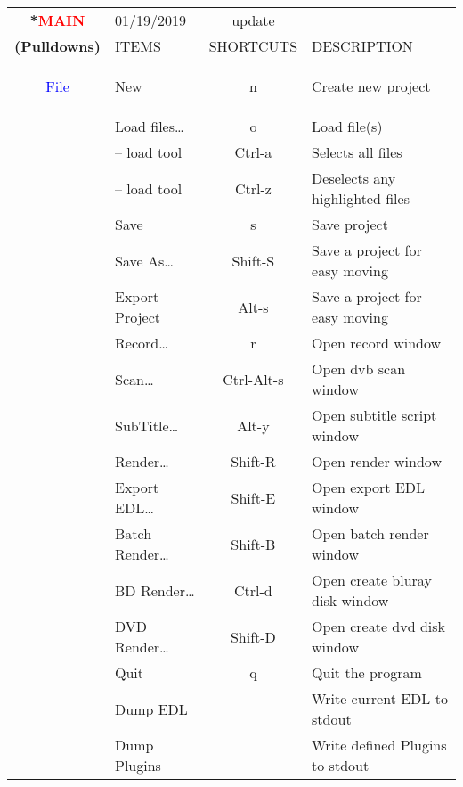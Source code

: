 \begin{center}
    \small
    \begin{longtable}{>{\bfseries}c l c p{6cm}}        
        \toprule
        \multirow{2}*{\textcolor{red}{MAIN}} & 01/19/2019 & update & \\
        \cline{2-4}
        \noalign{\smallskip}
        (Pulldowns) & ITEMS & SHORTCUTS & DESCRIPTION\\        
        \midrule
        \endhead        
        
        \textcolor{blue}{File} & New & n & Create new project \\        
             & Load files\dots & o & Load file(s)\\                          
             & -- load tool & Ctrl-a & Selects all files \\             
             & -- load tool & Ctrl-z & Deselects any highlighted files \\             
             & Save & s & Save project \\             
             & Save As\dots & Shift-S & Save a project for easy moving \\             
             & Export Project & Alt-s & Save a project for easy moving \\             
             & Record\dots & r & Open record window \\             
             & Scan\dots & Ctrl-Alt-s & Open dvb scan window \\             
             & SubTitle\dots & Alt-y & Open subtitle script window \\             
             & Render\dots & Shift-R & Open render window \\             
             & Export EDL\dots & Shift-E & Open export EDL window \\             
             & Batch Render\dots & Shift-B & Open batch render window \\             
             & BD Render\dots & Ctrl-d & Open create bluray disk window \\             
             & DVD Render\dots & Shift-D & Open create dvd disk window \\             
             & Quit & q & Quit the program \\             
             & Dump EDL &  & Write current EDL to stdout \\             
             & Dump Plugins &  & Write defined Plugins to stdout \\             

\end{longtable}
\end{center}

